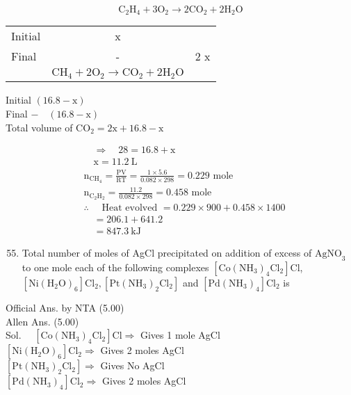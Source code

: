 \documentclass[10pt]{article}
\begin{document}
\[
\mathrm{C}_{2} \mathrm{H}_{4}+3 \mathrm{O}_{2} \rightarrow 2 \mathrm{CO}_{2}+2 \mathrm{H}_{2} \mathrm{O}
\]

\begin{center}
\begin{tabular}{lcc}
Initial & x &  \\
Final & - & 2 x \\
 & \(\mathrm{CH}_{4}+2 \mathrm{O}_{2} \rightarrow \mathrm{CO}_{2}+2 \mathrm{H}_{2} \mathrm{O}\) &  \\
\end{tabular}
\end{center}

Initial \((16.8-\mathrm{x})\)\\
Final \(-\quad(16.8-\mathrm{x})\)\\
Total volume of \(\mathrm{CO}_{2}=2 \mathrm{x}+16.8-\mathrm{x}\)

\[
\begin{aligned}
& \quad \Rightarrow \quad 28=16.8+\mathrm{x} \\
& \quad \mathrm{x}=11.2 \mathrm{~L} \\
& \mathrm{n}_{\mathrm{CH}_{4}}=\frac{\mathrm{PV}}{\mathrm{RT}}=\frac{1 \times 5.6}{0.082 \times 298}=0.229 \text { mole } \\
& \mathrm{n}_{\mathrm{C}_{2} \mathrm{H}_{2}}=\frac{11.2}{0.082 \times 298}=0.458 \text { mole } \\
& \therefore \quad \text { Heat evolved }=0.229 \times 900+0.458 \times 1400 \\
& \quad=206.1+641.2 \\
& \quad=847.3 \mathrm{~kJ}
\end{aligned}
\]

\begin{enumerate}
  \setcounter{enumi}{54}
  \item Total number of moles of AgCl precipitated on addition of excess of \(\mathrm{AgNO}_{3}\) to one mole each of the following complexes \(\left[\mathrm{Co}\left(\mathrm{NH}_{3}\right)_{4} \mathrm{Cl}_{2}\right] \mathrm{Cl}\), \(\left[\mathrm{Ni}\left(\mathrm{H}_{2} \mathrm{O}\right)_{6}\right] \mathrm{Cl}_{2},\left[\mathrm{Pt}\left(\mathrm{NH}_{3}\right)_{2} \mathrm{Cl}_{2}\right]\) and \(\left[\mathrm{Pd}\left(\mathrm{NH}_{3}\right)_{4}\right] \mathrm{Cl}_{2}\) is
\end{enumerate}

Official Ans. by NTA (5.00)\\
Allen Ans. (5.00)\\
Sol. \(\quad\left[\mathrm{Co}\left(\mathrm{NH}_{3}\right)_{4} \mathrm{Cl}_{2}\right] \mathrm{Cl} \Rightarrow\) Gives 1 mole AgCl\\
\(\left[\mathrm{Ni}\left(\mathrm{H}_{2} \mathrm{O}\right)_{6}\right] \mathrm{Cl}_{2} \Rightarrow\) Gives 2 moles AgCl\\
\(\left[\mathrm{Pt}\left(\mathrm{NH}_{3}\right)_{2} \mathrm{Cl}_{2}\right] \Rightarrow\) Gives No AgCl\\
\(\left[\mathrm{Pd}\left(\mathrm{NH}_{3}\right)_{4}\right] \mathrm{Cl}_{2} \Rightarrow\) Gives 2 moles AgCl
\end{document}
